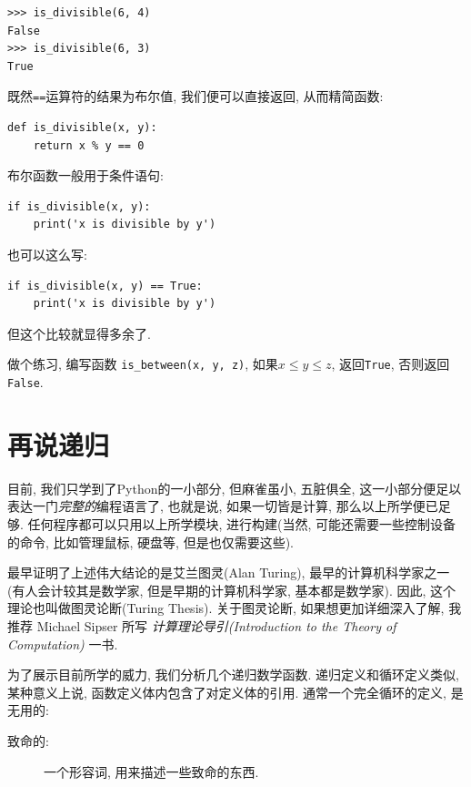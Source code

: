 \documentclass[10pt]{book}
\begin{document}
\begin{verbatim}
>>> is_divisible(6, 4)
False
>>> is_divisible(6, 3)
True
\end{verbatim}
%
 既然{\tt ==}运算符的结果为布尔值, 
我们便可以直接返回, 从而精简函数:

\begin{verbatim}
def is_divisible(x, y):
    return x % y == 0
\end{verbatim}
%
布尔函数一般用于条件语句:

\begin{verbatim}
if is_divisible(x, y):
    print('x is divisible by y')
\end{verbatim}
%
也可以这么写:

\begin{verbatim}
if is_divisible(x, y) == True:
    print('x is divisible by y')
\end{verbatim}
%
但这个比较就显得多余了. 

做个练习, 编写函数 \verb"is_between(x, y, z)", 
如果$x \le y \le z$, 返回{\tt True}, 否则返回{\tt False}.


\section{再说递归}
\label{more.recursion}

目前, 我们只学到了Python的一小部分, 但麻雀虽小, 五脏俱全, 
这一小部分便足以表达一门{\em 完整的}编程语言了, 
也就是说, 如果一切皆是计算, 那么以上所学便已足够. 
任何程序都可以只用以上所学模块, 进行构建(当然, 可能还需要一些控制设备
的命令, 比如管理鼠标, 硬盘等, 但是也仅需要这些).

最早证明了上述伟大结论的是艾兰图灵(Alan Turing), 最早的计算机科学家之一
(有人会计较其是数学家, 但是早期的计算机科学家, 基本都是数学家). 
因此, 这个理论也叫做图灵论断(Turing Thesis). 
关于图灵论断, 如果想更加详细深入了解, 我推荐 Michael Sipser 所写
 {\em 计算理论导引(Introduction to the Theory of Computation)} 一书.

为了展示目前所学的威力, 我们分析几个递归数学函数. 
递归定义和循环定义类似, 某种意义上说, 函数定义体内包含了对定义体的引用. 
通常一个完全循环的定义, 是无用的:

\begin{description}

\item[致命的:] 一个形容词, 用来描述一些致命的东西.

\end{description}
\end{document}

